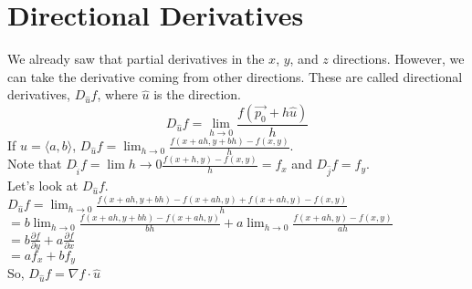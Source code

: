 \section{Directional Derivatives}
\noindent
We already saw that partial derivatives in the $x$, $y$, and $z$ directions. However, we can take the derivative coming from other directions. These are called directional derivatives, $D_{\hat{u}}{f}$, where $\hat{u}$ is the direction.
\begin{equation*}
	D_{\hat{u}}{f} = \lim_{h \to 0}{\frac{f(\vec{p_0} + h\hat{u})}{h}}
\end{equation*}
\noindent
If $\hat{u} = \langle a, b \rangle$, $D_{\hat{u}}{f} = \lim_{h \to 0}{\frac{f(x+ah, y+bh) - f(x,y)}{h}}$.\\
Note that $D_{\hat{i}}{f} = \lim{h \to 0}{\frac{f(x+h, y) - f(x, y)}{h}} = f_x$ and $D_{\hat{j}}{f} = f_y$.\\
Let's look at $D_{\hat{u}}{f}$.\\
\indent
$D_{\hat{u}}{f} = \lim_{h \to 0}{\frac{f(x+ah, y+bh) - f(x+ah, y) + f(x+ah, y) - f(x, y)}{h}}$\\
\indent
$= b\lim_{h \to 0}{\frac{f(x+ah, y+bh)-f(x+ah, y)}{bh}} + a\lim_{h \to 0}{\frac{f(x+ah, y) - f(x, y)}{ah}}$\\
\indent
$= b\frac{\partial f}{\partial y} + a\frac{\partial f}{\partial x}$\\
\indent
$= af_x + bf_y$\\
\indent
So, $D_{\hat{u}}{f} =\nabla f \cdot \hat{u}$
